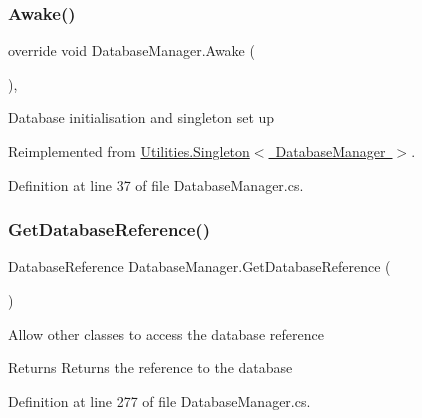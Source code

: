 \subsubsection{\texorpdfstring{Awake()}{Awake()}}
{\footnotesize\ttfamily override void Database\+Manager.\+Awake (\begin{DoxyParamCaption}{ }\end{DoxyParamCaption})\hspace{0.3cm}{\ttfamily [protected]}, {\ttfamily [virtual]}}



Database initialisation and singleton set up 



Reimplemented from \mbox{\hyperlink{class_utilities_1_1_singleton_a634b915d7ac492899512de602d59e650}{Utilities.\+Singleton$<$ Database\+Manager $>$}}.



Definition at line 37 of file Database\+Manager.\+cs.

\mbox{\label{class_database_manager_a14c609571c0d42f0735da6e8c8ff92c0}} 
\subsubsection{\texorpdfstring{Get\+Database\+Reference()}{GetDatabaseReference()}}
{\footnotesize\ttfamily Database\+Reference Database\+Manager.\+Get\+Database\+Reference (\begin{DoxyParamCaption}{ }\end{DoxyParamCaption})}



Allow other classes to access the database reference 

\begin{DoxyReturn}{Returns}
Returns the reference to the database
\end{DoxyReturn}


Definition at line 277 of file Database\+Manager.\+cs.

\mbox{\label{class_database_manager_a4c6fcf71634e8465870bb7468da305e4}} 
